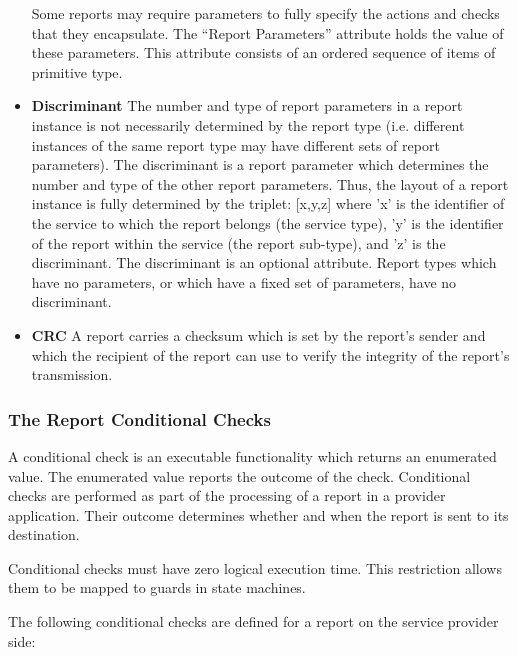 \begin{itemize}
Some reports may require parameters to fully specify the actions and checks that they encapsulate. The “Report Parameters” attribute holds the value of these parameters. This attribute consists of an ordered sequence of items of primitive type. 
\item \textbf{Discriminant}
The number and type of report parameters in a report instance is not necessarily determined by the report type (i.e. different instances of the same report type may have different sets of report parameters). The discriminant is a report parameter which determines the number and type of the other report parameters. Thus, the layout of a report instance is fully determined by the triplet: [x,y,z] where 'x' is the identifier of the service to which the report belongs (the service type), 'y' is the identifier of the report within the service (the report sub-type), and 'z' is the discriminant.  The discriminant is an optional attribute. Report types which have no parameters, or which have a fixed set of parameters, have no discriminant.
\item \textbf{CRC}
A report carries a checksum which is set by the report's sender and which the recipient of the report can use to verify the integrity of the report's transmission. 

\end{itemize}


\subsubsection{The Report Conditional Checks}\label{sec:RepConditionalChecks}

A conditional check is an executable functionality which returns an enumerated value. The enumerated value reports the outcome of the check. Conditional checks are performed as part of the processing of a report in a provider application. Their outcome determines whether and when the report is sent to its destination. 

Conditional checks must have zero logical execution time. This restriction allows them to be mapped to guards in state machines. 

The following conditional checks are defined for a report on the service provider side:

